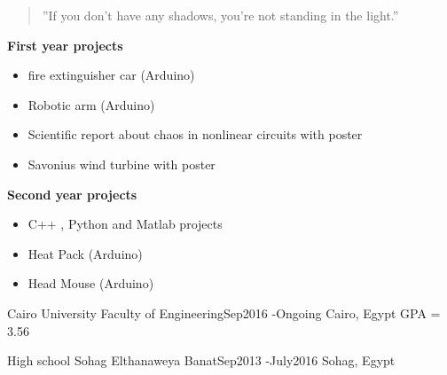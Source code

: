\begin{quote}
''If you don’t have any shadows, you’re not standing in the light.''
\end{quote}


\textbf{First year projects }
{\begin{itemize}
    \item fire extinguisher car (Arduino)
    \item 	Robotic arm (Arduino)
	\item Scientific report about chaos in nonlinear circuits with poster
     \item Savonius wind turbine with poster
\end{itemize}}

\divider

\textbf{Second year projects }
{\begin{itemize}
   \item C++ , Python and Matlab projects
    \item Heat Pack (Arduino)
    \item Head Mouse  (Arduino)
     
\end{itemize}}

\divider







\divider\smallskip








\cvevent
{Cairo University}
{Faculty of Engineering}{Sep2016 -Ongoing}
{Cairo, Egypt}
  GPA = 3.56

\divider

\cvevent
{High school}
{Sohag Elthanaweya Banat}{Sep2013 -July2016}
{Sohag, Egypt}


\divider

